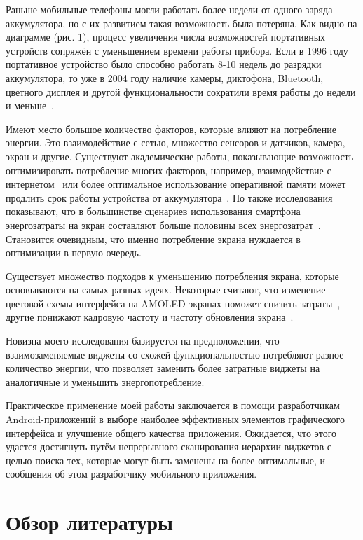 \documentclass[a4paper,14pt]{extarticle} %
\begin{document}
	Раньше мобильные телефоны могли работать более недели от одного заряда аккумулятора, но с их развитием такая возможность была потеряна. Как видно на диаграмме (рис. 1), процесс увеличения числа возможностей портативных устройств сопряжён с уменьшением времени работы прибора. Если в 1996 году портативное устройство было способно работать 8-10 недель до разрядки аккумулятора, то уже в 2004 году наличие камеры, диктофона, Bluetooth, цветного дисплея и другой функциональности сократили время работы до недели и меньше~\parencite{василенко2005методы}.
	
	Имеют место большое количество факторов, которые влияют на потребление энергии. Это взаимодействие с сетью, множество сенсоров и датчиков, камера, экран и другие. Существуют академические работы, показывающие возможность оптимизировать потребление многих факторов, например, взаимодействие с интернетом~\parencite{tuysuz2019real} или более оптимальное использование оперативной памяти может продлить срок работы устройства от аккумулятора~\parencite{li2014investigation}. Но также исследования показывают, что в большинстве сценариев использования смартфона энергозатраты на экран составляют больше половины всех энергозатрат~\parencite{bai2013android}. Становится очевидным, что именно потребление экрана нуждается в оптимизации в первую очередь.
	
	Существует множество подходов к уменьшению потребления экрана, которые основываются на самых разных идеях. Некоторые считают, что изменение цветовой схемы интерфейса на AMOLED экранах поможет снизить затраты~\parencite{wan2015detecting}, другие понижают кадровую частоту и частоту обновления экрана~\parencite{lee2018improving, huang2014intelligent}. 
	
	Новизна моего исследования базируется на предположении, что взаимозаменяемые виджеты со схожей функциональностью потребляют разное количество энергии, что позволяет заменить более затратные виджеты на аналогичные и уменьшить энергопотребление.
	
	Практическое применение моей работы заключается в помощи разработчикам Android-приложений в выборе наиболее эффективных элементов графического интерфейса и улучшение общего качества приложения. Ожидается, что этого удастся достигнуть путём непрерывного сканирования иерархии виджетов с целью поиска тех, которые могут быть заменены на более оптимальные, и сообщения об этом разработчику мобильного приложения.
	
	\newpage
	\section{Обзор литературы} %
	
\end{document}
